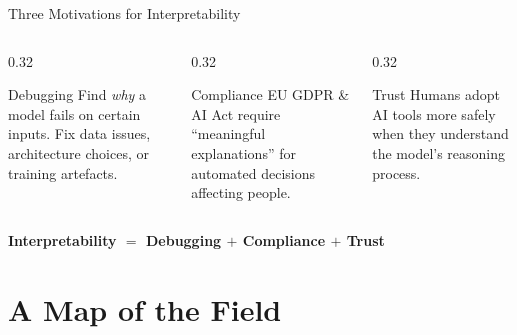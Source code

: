 \documentclass[aspectratio=169]{beamer}
\begin{document}
\begin{frame}{Three Motivations for Interpretability}
  \begin{columns}[T]
    \begin{column}{0.32\textwidth}
      \begin{block}{\faWrench\; Debugging}
        Find \emph{why} a model fails on certain inputs.
        Fix data issues, architecture choices, or training artefacts.
      \end{block}
    \end{column}
    \begin{column}{0.32\textwidth}
      \begin{exampleblock}{\faGavel\; Compliance}
        EU GDPR \& AI Act require ``meaningful explanations''
        for automated decisions affecting people.
      \end{exampleblock}
    \end{column}
    \begin{column}{0.32\textwidth}
      \begin{alertblock}{\faUserShield\; Trust}
        Humans adopt AI tools more safely when they understand
        the model's reasoning process.
      \end{alertblock}
    \end{column}
  \end{columns}

  \vspace{1em}
  \begin{center}
    \large \textbf{Interpretability $=$ Debugging $+$ Compliance $+$ Trust}
  \end{center}
\end{frame}

\section{A Map of the Field}
\end{document}
